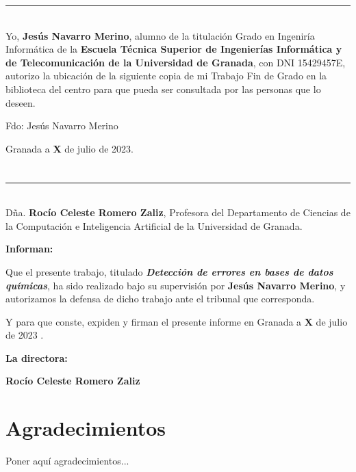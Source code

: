 \noindent\rule[-1ex]{\textwidth}{2pt}\\[4.5ex]

Yo, \textbf{Jesús Navarro Merino}, alumno de la titulación Grado en Ingeniría Informática de la \textbf{Escuela Técnica Superior
de Ingenierías Informática y de Telecomunicación de la Universidad de Granada}, con DNI 15429457E, autorizo la
ubicación de la siguiente copia de mi Trabajo Fin de Grado en la biblioteca del centro para que pueda ser
consultada por las personas que lo deseen.

\vspace{6cm}

\noindent Fdo: Jesús Navarro Merino

\vspace{2cm}

\begin{flushright}
Granada a \textbf{X} de julio de 2023.
\end{flushright}


\chapter*{}
\thispagestyle{empty}

\noindent\rule[-1ex]{\textwidth}{2pt}\\[4.5ex]

Dña. \textbf{Rocío Celeste Romero Zaliz}, Profesora del Departamento de Ciencias de la Computación e Inteligencia Artificial de la Universidad de Granada.


\vspace{0.5cm}

\textbf{Informan:}

\vspace{0.5cm}

Que el presente trabajo, titulado \textit{\textbf{Detección de errores en bases de datos químicas}},
ha sido realizado bajo su supervisión por \textbf{Jesús Navarro Merino}, y autorizamos la defensa de dicho trabajo ante el tribunal que corresponda.

\vspace{0.5cm}

Y para que conste, expiden y firman el presente informe en Granada a \textbf{X} de julio de 2023 .

\vspace{1cm}

\textbf{La directora:}

\vspace{5cm}

\noindent \textbf{Rocío Celeste Romero Zaliz}

\chapter*{Agradecimientos}
\thispagestyle{empty}

       \vspace{1cm}


Poner aquí agradecimientos...

